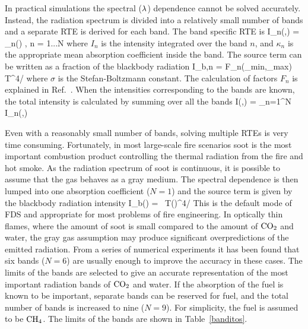 \documentclass[11pt]{book}
\begin{document}
In practical simulations the spectral ($\lambda$) dependence cannot be solved
accurately. Instead, the radiation spectrum is divided into
a relatively small number of bands and a separate RTE is derived for
each band. The band specific RTE is
\be   \bs \cdot \nabla I_n(\bx,\bs) = \kappa_n(\bx) \;
        \left[ I_{b,n}(\bx) - I_n(\bx,\bs) \right],\;\; n = 1...N
\label{bandRTE} \ee
where $I_n$ is the intensity integrated over the band $n$, and $\kappa_n$
is the appropriate mean absorption coefficient inside the band. The
source term can be written as a fraction of the blackbody radiation
\be I_{b,n} = F_n(\la_{\rm min},\la_{\rm max}) \; \sigma \; T^4/\pi \ee
where $\sigma$ is the Stefan-Boltzmann constant.
The calculation of factors $F_n$ is explained in Ref.~\cite{Siegel:1}.
When the intensities corresponding to the bands are known, the total
intensity is calculated by summing over all the bands
\be I(\bx,\bs) = \sum_{n=1}^N I_n(\bx,\bs) \ee

Even with a reasonably small number of bands, solving multiple
RTEs is very time consuming. Fortunately, in most large-scale fire
scenarios soot is the most important combustion product controlling the
thermal radiation from the fire and hot smoke. As the radiation spectrum of
soot is continuous, it is possible to assume that the gas behaves as a
gray medium.  The spectral dependence is then lumped into one
absorption coefficient ($N=1$) and the source term is given by the
blackbody radiation intensity
\be I_b(\bx) = \sigma \, T(\bx)^4/\pi \ee
This is the default mode of FDS and appropriate for most problems of
fire engineering. In optically thin flames, where the amount of soot
is small compared to the amount of $\rm CO_2$ and water, the gray gas
assumption may produce significant overpredictions of the emitted
radiation. From a series of numerical experiments it has been found
that six bands ($N=6$) are usually enough to improve the accuracy in
these cases.  The limits of the bands are selected to give an accurate
representation of the most important radiation bands of $\rm CO_2$ and
water. If the absorption of the fuel is known to be important,
separate bands can be reserved for fuel, and the total number of
bands is increased to nine ($N=9$).
For simplicity, the fuel is assumed to be $\rm CH_4$.
The limits of the bands are shown in Table~\ref{banditos}.
\end{document}
